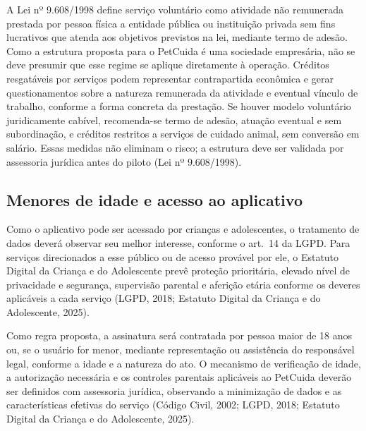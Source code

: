 A Lei nº 9.608/1998 define serviço voluntário como atividade não remunerada prestada por pessoa física a entidade pública ou instituição privada sem fins lucrativos que atenda aos objetivos previstos na lei, mediante termo de adesão. Como a estrutura proposta para o PetCuida é uma sociedade empresária, não se deve presumir que esse regime se aplique diretamente à operação. Créditos resgatáveis por serviços podem representar contrapartida econômica e gerar questionamentos sobre a natureza remunerada da atividade e eventual vínculo de trabalho, conforme a forma concreta da prestação. Se houver modelo voluntário juridicamente cabível, recomenda-se termo de adesão, atuação eventual e sem subordinação, e créditos restritos a serviços de cuidado animal, sem conversão em salário. Essas medidas não eliminam o risco; a estrutura deve ser validada por assessoria jurídica antes do piloto (Lei nº 9.608/1998).

\subsection{Menores de idade e acesso ao aplicativo}
Como o aplicativo pode ser acessado por crianças e adolescentes, o tratamento de dados deverá observar seu melhor interesse, conforme o art.~14 da LGPD. Para serviços direcionados a esse público ou de acesso provável por ele, o Estatuto Digital da Criança e do Adolescente prevê proteção prioritária, elevado nível de privacidade e segurança, supervisão parental e aferição etária conforme os deveres aplicáveis a cada serviço (LGPD, 2018; Estatuto Digital da Criança e do Adolescente, 2025).

Como regra proposta, a assinatura será contratada por pessoa maior de 18 anos ou, se o usuário for menor, mediante representação ou assistência do responsável legal, conforme a idade e a natureza do ato. O mecanismo de verificação de idade, a autorização necessária e os controles parentais aplicáveis ao PetCuida deverão ser definidos com assessoria jurídica, observando a minimização de dados e as características efetivas do serviço (Código Civil, 2002; LGPD, 2018; Estatuto Digital da Criança e do Adolescente, 2025).